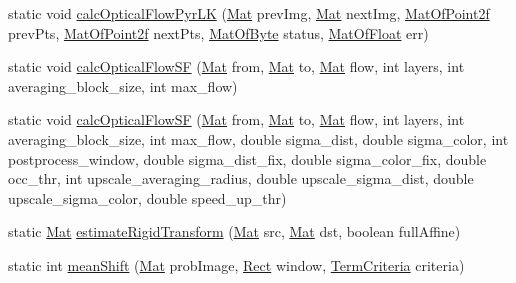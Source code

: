 \begin{DoxyCompactItemize}
static void \mbox{\hyperlink{classorg_1_1opencv_1_1video_1_1_video_a45406270ec0e90776d151c4778cc577c}{calc\+Optical\+Flow\+Pyr\+LK}} (\mbox{\hyperlink{classorg_1_1opencv_1_1core_1_1_mat}{Mat}} prev\+Img, \mbox{\hyperlink{classorg_1_1opencv_1_1core_1_1_mat}{Mat}} next\+Img, \mbox{\hyperlink{classorg_1_1opencv_1_1core_1_1_mat_of_point2f}{Mat\+Of\+Point2f}} prev\+Pts, \mbox{\hyperlink{classorg_1_1opencv_1_1core_1_1_mat_of_point2f}{Mat\+Of\+Point2f}} next\+Pts, \mbox{\hyperlink{classorg_1_1opencv_1_1core_1_1_mat_of_byte}{Mat\+Of\+Byte}} status, \mbox{\hyperlink{classorg_1_1opencv_1_1core_1_1_mat_of_float}{Mat\+Of\+Float}} err)
\item 
static void \mbox{\hyperlink{classorg_1_1opencv_1_1video_1_1_video_a18283efc105943b982df4e5b24774acd}{calc\+Optical\+Flow\+SF}} (\mbox{\hyperlink{classorg_1_1opencv_1_1core_1_1_mat}{Mat}} from, \mbox{\hyperlink{classorg_1_1opencv_1_1core_1_1_mat}{Mat}} to, \mbox{\hyperlink{classorg_1_1opencv_1_1core_1_1_mat}{Mat}} flow, int layers, int averaging\+\_\+block\+\_\+size, int max\+\_\+flow)
\item 
static void \mbox{\hyperlink{classorg_1_1opencv_1_1video_1_1_video_a796c757720a739be9d8d31e1fbc38b9a}{calc\+Optical\+Flow\+SF}} (\mbox{\hyperlink{classorg_1_1opencv_1_1core_1_1_mat}{Mat}} from, \mbox{\hyperlink{classorg_1_1opencv_1_1core_1_1_mat}{Mat}} to, \mbox{\hyperlink{classorg_1_1opencv_1_1core_1_1_mat}{Mat}} flow, int layers, int averaging\+\_\+block\+\_\+size, int max\+\_\+flow, double sigma\+\_\+dist, double sigma\+\_\+color, int postprocess\+\_\+window, double sigma\+\_\+dist\+\_\+fix, double sigma\+\_\+color\+\_\+fix, double occ\+\_\+thr, int upscale\+\_\+averaging\+\_\+radius, double upscale\+\_\+sigma\+\_\+dist, double upscale\+\_\+sigma\+\_\+color, double speed\+\_\+up\+\_\+thr)
\item 
static \mbox{\hyperlink{classorg_1_1opencv_1_1core_1_1_mat}{Mat}} \mbox{\hyperlink{classorg_1_1opencv_1_1video_1_1_video_ad9c2fbb377a485b9619be2c78eaf7cee}{estimate\+Rigid\+Transform}} (\mbox{\hyperlink{classorg_1_1opencv_1_1core_1_1_mat}{Mat}} src, \mbox{\hyperlink{classorg_1_1opencv_1_1core_1_1_mat}{Mat}} dst, boolean full\+Affine)
\item 
static int \mbox{\hyperlink{classorg_1_1opencv_1_1video_1_1_video_a3de9542ac0e9d45fec178bbad1539c51}{mean\+Shift}} (\mbox{\hyperlink{classorg_1_1opencv_1_1core_1_1_mat}{Mat}} prob\+Image, \mbox{\hyperlink{classorg_1_1opencv_1_1core_1_1_rect}{Rect}} window, \mbox{\hyperlink{classorg_1_1opencv_1_1core_1_1_term_criteria}{Term\+Criteria}} criteria)
\item 

\end{DoxyCompactItemize}
